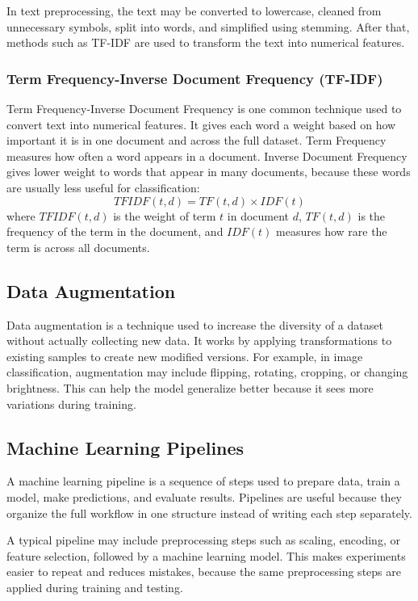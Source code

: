 \documentclass[12pt,a4paper]{report}
\begin{document}
\noindent In text preprocessing, the text may be converted to lowercase, cleaned from
unnecessary symbols, split into words, and simplified using stemming. After that,
methods such as TF-IDF are used to transform the text into numerical features.

\subsubsection{Term Frequency-Inverse Document Frequency (TF-IDF)}
Term Frequency-Inverse Document Frequency is one common technique used
to convert text into numerical features. It gives each word a weight based on
how important it is in one document and across the full dataset. Term Frequency
measures how often a word appears in a document. Inverse Document Frequency gives
lower weight to words that appear in many documents, because these words are
usually less useful for classification:
\[
TFIDF(t,d) = TF(t,d) \times IDF(t)
\]
where $TFIDF(t,d)$ is the weight of term $t$ in document $d$, $TF(t,d)$ is the
frequency of the term in the document, and $IDF(t)$ measures how rare the term
is across all documents.

\subsection{Data Augmentation}
Data augmentation is a technique used to increase the diversity of a dataset
without actually collecting new data. It works by applying transformations to
existing samples to create new modified versions. For example, in image
classification, augmentation may include flipping, rotating, cropping, or
changing brightness. This can help the model generalize better because it sees
more variations during training.

\subsection{Machine Learning Pipelines}
A machine learning pipeline is a sequence of steps used to prepare data, train a
model, make predictions, and evaluate results. Pipelines are useful because they
organize the full workflow in one structure instead of writing each step
separately.

A typical pipeline may include preprocessing steps such as scaling, encoding, or
feature selection, followed by a machine learning model. This makes experiments
easier to repeat and reduces mistakes, because the same preprocessing steps are
applied during training and testing.
\end{document}
